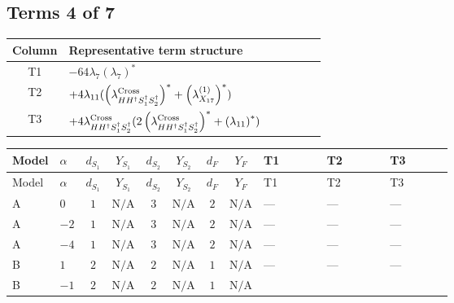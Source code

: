 \documentclass[8pt]{article}
\begin{document}
\begin{landscape}
\subsection*{Terms 4 of 7}
\begin{center}
\begin{tabular}{@{}c >{\raggedright\arraybackslash}p{0.82\linewidth}@{}}
\toprule
Column & Representative term structure \\
\midrule
T1 & \(\displaystyle -64 {\lambda_{7}} \left({\lambda_{7}}\right)^{*}\) \\
\midrule
T2 & \(\displaystyle +4 {\lambda_{11}} (\left({\lambda_{H H^\dagger S_1^\dagger S_2^\dagger}^{\rm Cross}}\right)^{*}+\left({\lambda_{X_{17}}^{(1)}}\right)^{*})\) \\
\midrule
T3 & \(\displaystyle +4 {\lambda_{H H^\dagger S_1^\dagger S_2^\dagger}^{\rm Cross}} (2 \left({\lambda_{H H^\dagger S_1^\dagger S_2^\dagger}^{\rm Cross}}\right)^{*}+\left({\lambda_{11}}\right)^{*})\) \\
\midrule
\bottomrule
\end{tabular}
\end{center}
\smallskip
\tiny
\begin{longtable}{@{}llcccccc >{\raggedright\arraybackslash}p{0.21\linewidth} >{\raggedright\arraybackslash}p{0.21\linewidth} >{\raggedright\arraybackslash}p{0.21\linewidth}@{}}
\toprule
Model & $\alpha$ & $d_{S_1}$ & $Y_{S_1}$ & $d_{S_2}$ & $Y_{S_2}$ & $d_F$ & $Y_F$ & T1 & T2 & T3 \\
\midrule
\endfirsthead
\toprule
Model & $\alpha$ & $d_{S_1}$ & $Y_{S_1}$ & $d_{S_2}$ & $Y_{S_2}$ & $d_F$ & $Y_F$ & T1 & T2 & T3 \\
\midrule
\endhead
A & $0$ & $1$ & $\text{N/A}$ & $3$ & $\text{N/A}$ & $2$ & $\text{N/A}$ & --- & --- & --- \\
\midrule
A & $-2$ & $1$ & $\text{N/A}$ & $3$ & $\text{N/A}$ & $2$ & $\text{N/A}$ & --- & --- & --- \\
\midrule
A & $-4$ & $1$ & $\text{N/A}$ & $3$ & $\text{N/A}$ & $2$ & $\text{N/A}$ & --- & --- & --- \\
\midrule
B & $1$ & $2$ & $\text{N/A}$ & $2$ & $\text{N/A}$ & $1$ & $\text{N/A}$ & --- & --- & --- \\
\midrule
B & $-1$ & $2$ & $\text{N/A}$ & $2$ & $\text{N/A}$ & $1$ & $\text{N/A}$ & \scriptsize\adjustbox{max width=\linewidth}{$\begin{gathered} -64 {\lambda_{7}} \left({\lambda_{7}}\right)^{*}\end{gathered}$} & \scriptsize\adjustbox{max width=\linewidth}{$\begin{gathered} +4 {\lambda_{11}} (\left({\lambda_{H H^\dagger S_1^\dagger S_2^\dagger}^{\rm Cross}}\right)^{*}+\left({\lambda_{X_{17}}^{(1)}}\right)^{*})\end{gathered}$} & \scriptsize\adjustbox{max width=\linewidth}{$\begin{gathered} +4 {\lambda_{H H^\dagger S_1^\dagger S_2^\dagger}^{\rm Cross}} (2 \left({\lambda_{H H^\dagger S_1^\dagger S_2^\dagger}^{\rm Cross}}\right)^{*}+\left({\lambda_{11}}\right)^{*})\end{gathered}$} \\

\end{longtable}
\end{landscape}
\end{document}
